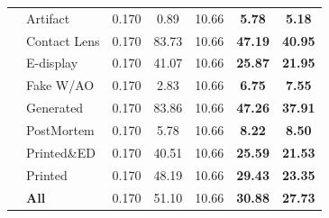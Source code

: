 \begin{table}[!htbp]
\begin{tabular}{l l c c c c c}
    & Artifact             & 0.170 &   0.89 &  10.66 &  \textbf{5.78} &  \textbf{5.18} \\
    & Contact Lens         & 0.170 &  83.73 &  10.66 & \textbf{47.19} & \textbf{40.95} \\
    & E-display            & 0.170 &  41.07 &  10.66 & \textbf{25.87} & \textbf{21.95} \\
    & Fake W/AO            & 0.170 &   2.83 &  10.66 &  \textbf{6.75} &  \textbf{7.55} \\
    & Generated            & 0.170 &  83.86 &  10.66 & \textbf{47.26} & \textbf{37.91} \\
    & PostMortem           & 0.170 &   5.78 &  10.66 &  \textbf{8.22} &  \textbf{8.50} \\
    & Printed\&ED          & 0.170 &  40.51 &  10.66 & \textbf{25.59} & \textbf{21.53} \\
    & Printed              & 0.170 &  48.19 &  10.66 & \textbf{29.43} & \textbf{23.35} \\
    & \textbf{All}               & 0.170 &  51.10 &  10.66 & \textbf{30.88} & \textbf{27.73} \\

\bottomrule
\end{tabular}
\end{table}